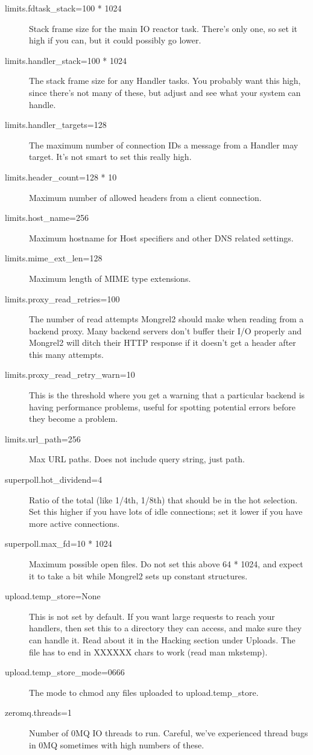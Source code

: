 \begin{description}
\item[limits.fdtask\_stack=100 * 1024] Stack frame size for the main IO reactor task.  There's only one, so set it high if you can, but it could possibly go lower.
\item[limits.handler\_stack=100 * 1024] The stack frame size for any Handler tasks. You probably want this high, since there's not many of these, but adjust and see what your system can handle.
\item[limits.handler\_targets=128] The maximum number of connection IDs a message from a Handler may target.  It's not smart to set this really high.
\item[limits.header\_count=128 * 10] Maximum number of allowed headers from a client connection.
\item[limits.host\_name=256] Maximum hostname for Host specifiers and other DNS related settings.
\item[limits.mime\_ext\_len=128] Maximum length of MIME type extensions.
\item[limits.proxy\_read\_retries=100] The number of read attempts Mongrel2 should make when reading from a backend proxy. Many backend servers don't buffer their I/O properly and Mongrel2 will ditch their HTTP response if it doesn't get a header after this many attempts.
\item[limits.proxy\_read\_retry\_warn=10] This is the threshold where you get a warning that a particular backend is having performance problems, useful for spotting potential errors before they become a problem.
\item[limits.url\_path=256] Max URL paths. Does not include query string, just path.
\item[superpoll.hot\_dividend=4] Ratio of the total (like 1/4th, 1/8th) that should be in the hot selection.  Set this higher if you have lots of idle connections; set it lower if you have more active connections.
\item[superpoll.max\_fd=10 * 1024] Maximum possible open files.  Do not set this above 64 * 1024, and expect it to take a bit while Mongrel2 sets up constant structures.
\item[upload.temp\_store=None] This is not set by default.  If you want large requests to reach your handlers, then set this to a directory they can access, and make sure they can handle it.  Read about it in the Hacking section under Uploads.  The file has to end in XXXXXX chars to work (read man mkstemp).
\item[upload.temp\_store\_mode=0666] The mode to chmod any files uploaded to upload.temp\_store.
\item[zeromq.threads=1] Number of 0MQ IO threads to run.  Careful, we've experienced thread bugs in 0MQ sometimes with high numbers of these.


\end{description}

